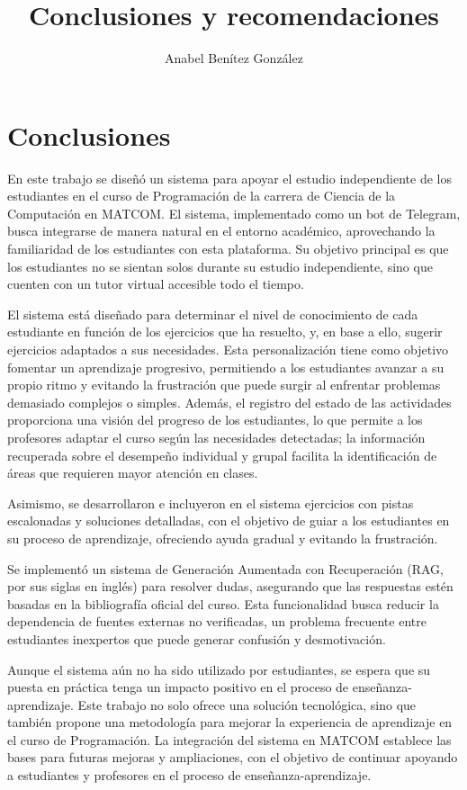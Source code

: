 \documentclass{article}
\title{Conclusiones y recomendaciones}
\author{Anabel Benítez González}
\date{}
\begin{document}
\maketitle

\section{Conclusiones}

En este trabajo se diseñó un sistema para apoyar el estudio independiente de los estudiantes en el curso de Programación de la carrera de Ciencia de la Computación en MATCOM. El sistema, implementado como un bot de Telegram, busca integrarse de manera natural en el entorno académico, aprovechando la familiaridad de los estudiantes con esta plataforma. Su objetivo principal es que los estudiantes no se sientan solos durante su estudio independiente, sino que cuenten con un tutor virtual accesible todo el tiempo.

El sistema está diseñado para determinar el nivel de conocimiento de cada estudiante en función de los ejercicios que ha resuelto, y, en base a ello, sugerir ejercicios adaptados a sus necesidades. Esta personalización tiene como objetivo fomentar un aprendizaje progresivo, permitiendo a los estudiantes avanzar a su propio ritmo y evitando la frustración que puede surgir al enfrentar problemas demasiado complejos o simples. Además, el registro del estado de las actividades proporciona una visión del progreso de los estudiantes, lo que permite a los profesores adaptar el curso según las necesidades detectadas; la información recuperada sobre el desempeño individual y grupal facilita la identificación de áreas que requieren mayor atención en clases.

Asimismo, se desarrollaron e incluyeron en el sistema ejercicios con pistas escalonadas y soluciones detalladas, con el objetivo de guiar a los estudiantes en su proceso de aprendizaje, ofreciendo ayuda gradual y evitando la frustración.

Se implementó un sistema de Generación Aumentada con Recuperación (RAG, por sus siglas en inglés) para resolver dudas, asegurando que las respuestas estén basadas en la bibliografía oficial del curso. Esta funcionalidad busca reducir la dependencia de fuentes externas no verificadas, un problema frecuente entre estudiantes inexpertos que puede generar confusión y desmotivación.

Aunque el sistema aún no ha sido utilizado por estudiantes, se espera que su puesta en práctica tenga un impacto positivo en el proceso de enseñanza-aprendizaje. Este trabajo no solo ofrece una solución tecnológica, sino que también propone una metodología para mejorar la experiencia de aprendizaje en el curso de Programación. La integración del sistema en MATCOM establece las bases para futuras mejoras y ampliaciones, con el objetivo de continuar apoyando a estudiantes y profesores en el proceso de enseñanza-aprendizaje.
\end{document}
